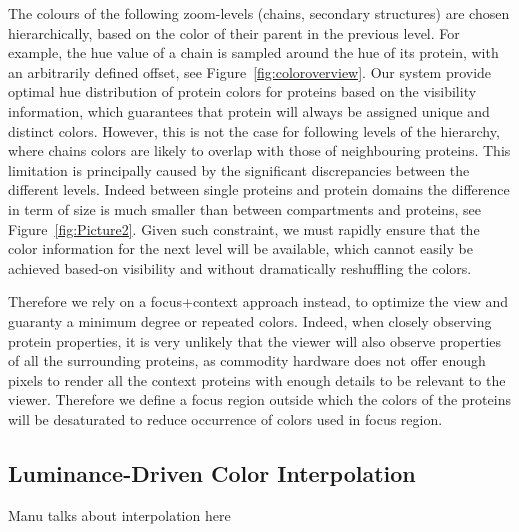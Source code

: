 \documentclass[review,journal]{vgtc}         %
\begin{document}
The colours of the following zoom-levels (chains, secondary structures) are chosen hierarchically, based on the color of their parent in the previous level.
For example, the hue value of a chain is sampled around the hue of its protein, with an arbitrarily defined offset, see Figure~\ref{fig:coloroverview}.
Our system provide optimal hue distribution of protein colors for proteins based on the visibility information, which guarantees that protein will always be assigned unique and distinct colors.
However, this is not the case for following levels of the hierarchy, where chains colors are likely to overlap with those of neighbouring proteins.  
This limitation is principally caused by the significant discrepancies between the different levels.
Indeed between single proteins and protein domains the difference in term of size is much smaller than between compartments and proteins, see Figure~\ref{fig:Picture2}.
Given such constraint, we must rapidly ensure that the color information for the next level will be available, which cannot easily be achieved based-on visibility and without dramatically reshuffling the colors.

Therefore we rely on a focus+context approach instead, to optimize the view and guaranty a minimum degree or repeated colors.
Indeed, when closely observing protein properties, it is very unlikely that the viewer will also observe properties of all the surrounding proteins, as commodity hardware does not offer enough pixels to render all the context proteins with enough details to be relevant to the viewer.
Therefore we define a focus region outside which the colors of the proteins will be desaturated to reduce occurrence of colors used in focus region.

\subsection{Luminance-Driven Color Interpolation}

Manu talks about interpolation here
\end{document}

